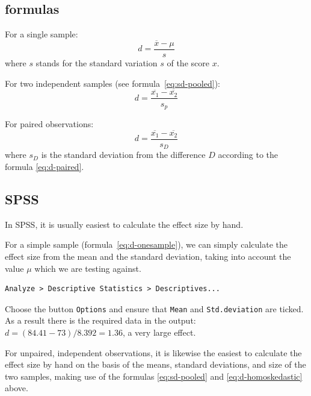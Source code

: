 \documentclass[
]{book}
\begin{document}
\hypertarget{sec:formulas13-5}{%
\subsection{formulas}\label{sec:formulas13-5}}

For a single sample:
\begin{equation}
   \label{eq:d-onesample}
  d = \frac{\overline{x}-\mu}{s}
\end{equation}
where \(s\) stands for the standard variation \(s\)
of the score \(x\).

For two independent samples (see
formula~\eqref{eq:sd-pooled}):
\begin{equation}
  \label{eq:d-homoskedastic}
  d = \frac{ \overline{x_1}-\overline{x_2} } { s_p }
\end{equation}

For paired observations:
\begin{equation}
  \label{eq:d-paired}
  d = \frac{ \overline{x_1}-\overline{x_2} } { s_D }
\end{equation}
where \(s_D\) is the
standard deviation from the difference \(D\) according
to the formula \eqref{eq:d-paired}.

\hypertarget{spss-13-2}{%
\subsection{SPSS}\label{spss-13-2}}

In SPSS, it is usually easiest to calculate the effect size
by hand.

For a simple sample
(formula~\eqref{eq:d-onesample}), we can simply calculate the
effect size from the mean and the standard deviation, taking into account
the value \(\mu\) which we are testing against.

\begin{verbatim}
Analyze > Descriptive Statistics > Descriptives...
\end{verbatim}

Choose the button \texttt{Options} and ensure that \texttt{Mean} and \texttt{Std.deviation} are
ticked. As a result there is the required data in the output:\\
\(d = (84.41 - 73) / 8.392 = 1.36\), a very large effect.

For unpaired, independent observations, it is likewise the easiest
to calculate the effect size by hand on the basis of the
means, standard deviations, and size of the two samples, making use
of the formulas
\eqref{eq:sd-pooled} and
\eqref{eq:d-homoskedastic} above.
\end{document}
